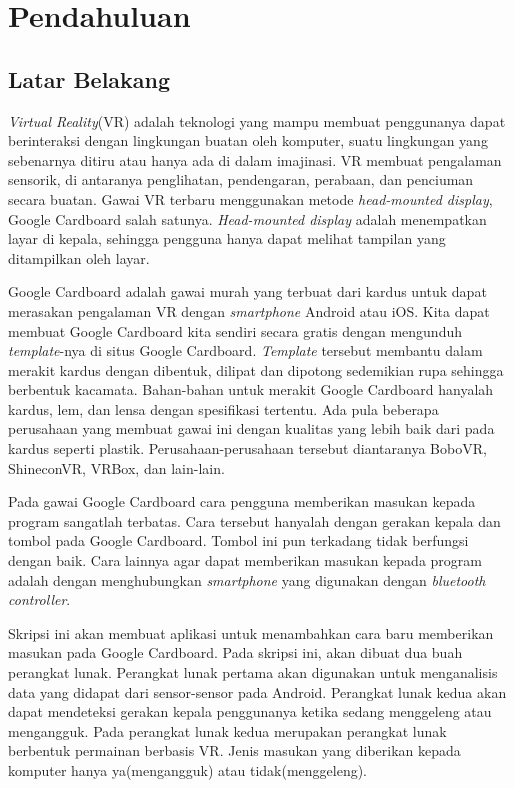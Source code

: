 \chapter{Pendahuluan}
\label{chap:pendahuluan}

\section{Latar Belakang}
\label{sec:latar_belakang}

\textit{Virtual Reality}(VR) adalah teknologi yang mampu membuat penggunanya dapat berinteraksi dengan lingkungan buatan oleh komputer, suatu lingkungan yang sebenarnya ditiru atau hanya ada di dalam imajinasi.\cite{parisi_2015} VR membuat pengalaman sensorik, di antaranya penglihatan, pendengaran, perabaan, dan penciuman secara buatan.\cite{kim_2005} Gawai VR terbaru menggunakan metode \textit{head-mounted display}, Google Cardboard salah satunya. \textit{Head-mounted display} adalah menempatkan layar di kepala, sehingga pengguna hanya dapat melihat tampilan yang ditampilkan oleh layar.\cite{vince_2004}

Google Cardboard\cite{googlevr} adalah gawai murah yang terbuat dari kardus untuk dapat merasakan pengalaman VR dengan \textit{smartphone} Android atau iOS. Kita dapat membuat Google Cardboard kita sendiri secara gratis dengan mengunduh \textit{template}-nya di situs Google Cardboard. \textit{Template} tersebut membantu dalam merakit kardus dengan dibentuk, dilipat dan dipotong sedemikian rupa sehingga berbentuk kacamata. Bahan-bahan untuk merakit Google Cardboard hanyalah kardus, lem, dan lensa dengan spesifikasi tertentu. Ada pula beberapa perusahaan yang membuat gawai ini dengan kualitas yang lebih baik dari pada kardus seperti plastik. Perusahaan-perusahaan tersebut diantaranya BoboVR, ShineconVR, VRBox, dan lain-lain.

Pada gawai Google Cardboard cara pengguna memberikan masukan kepada program sangatlah terbatas. Cara tersebut hanyalah dengan gerakan kepala dan tombol pada Google Cardboard. Tombol ini pun terkadang tidak berfungsi dengan baik. Cara lainnya agar dapat memberikan masukan kepada program adalah dengan menghubungkan \textit{smartphone} yang digunakan dengan \textit{bluetooth controller}.

Skripsi ini akan membuat aplikasi untuk menambahkan cara baru  memberikan masukan pada Google Cardboard. Pada skripsi ini, akan dibuat dua buah perangkat lunak. Perangkat lunak pertama akan digunakan untuk menganalisis data yang didapat dari sensor-sensor pada Android. Perangkat lunak kedua akan dapat mendeteksi gerakan kepala penggunanya ketika sedang menggeleng atau mengangguk. Pada perangkat lunak kedua merupakan perangkat lunak berbentuk permainan berbasis VR. Jenis masukan yang diberikan kepada komputer hanya ya(mengangguk) atau tidak(menggeleng).

